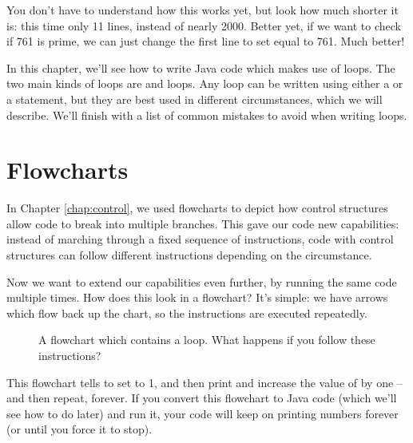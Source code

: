 You don't have to understand how this works yet, but look how much shorter it is: this time only 11 lines, instead of nearly 2000. Better yet, if we want to check if 761 is prime, we can just change the first line to set  equal to 761. Much better!

In this chapter, we'll see how to write Java code which makes use of loops. The two main kinds of loops are  and  loops. Any loop can be written using either a  or a  statement, but they are best used in different circumstances, which we will describe. We'll finish with a list of common mistakes to avoid when writing loops.

\section{Flowcharts}

In Chapter \ref{chap:control}, we used flowcharts to depict how control structures allow code to break into multiple branches. This gave our code new capabilities: instead of marching through a fixed sequence of instructions, code with control structures can follow different instructions depending on the circumstance.

Now we want to extend our capabilities even further, by running the same code multiple times. How does this look in a flowchart? It's simple: we have arrows which flow back up the chart, so the instructions are executed repeatedly.

\begin{figure}
    \centering
    \caption{A flowchart which contains a loop. What happens if you follow these instructions?}
    \label{fig:loop_flowchart_example_1}
\end{figure}

This flowchart tells to set  to 1, and then print  and increase the value of  by one -- and then repeat, forever. If you convert this flowchart to Java code (which we'll see how to do later) and run it, your code will keep on printing numbers forever (or until you force it to stop).

